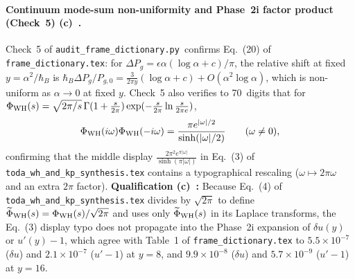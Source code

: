\documentclass[11pt,a4paper]{article}
\newcommand{\Lc}{\textsf{\textbf{(c)}}\ }
\newcommand{\scr}{\texttt{audit\_\allowbreak frame\_\allowbreak dictionary.py}}
\begin{document}
\paragraph{Continuum mode-sum non-uniformity and Phase~2i factor product (Check~5) \Lc.}
Check~5 of \scr\ confirms Eq.~(20) of \texttt{frame\_\allowbreak dictionary.tex}:
for $\Delta P_g=\epsilon\alpha(\log\alpha+c)/\pi$, the relative shift at fixed
$y=\alpha^2/\hbar_B$ is $\hbar_B\Delta P_g/P_{g,0}=\frac{3}{2\pi y}(\log\alpha+c)+O(\alpha^2\log\alpha)$,
which is non-uniform as $\alpha\to 0$ at fixed $y$.
Check~5 also verifies to 70~digits that for
$\Phi_{\rm WH}(s)=\sqrt{2\pi/s}\,\Gamma(1+\frac{s}{2\pi})\exp(-\frac{s}{2\pi}\ln\frac{s}{2\pi e})$,
\[
 \Phi_{\rm WH}(i\omega)\Phi_{\rm WH}(-i\omega)=\frac{\pi e^{|\omega|/2}}{\sinh(|\omega|/2)}
 \qquad (\omega\ne 0),
\]
confirming that the middle display $\frac{2\pi^2 e^{\pi|\omega|}}{\sinh(\pi|\omega|)}$
in Eq.~(3) of \texttt{toda\_\allowbreak wh\_\allowbreak and\_\allowbreak kp\_\allowbreak synthesis.tex}
contains a typographical rescaling ($\omega\mapsto 2\pi\omega$ and an extra $2\pi$
factor). \textbf{Qualification \Lc:} Because Eq.~(4) of
\texttt{toda\_\allowbreak wh\_\allowbreak and\_\allowbreak kp\_\allowbreak synthesis.tex}
divides by $\sqrt{2\pi}$ to define $\widetilde\Phi_{\rm WH}(s)=\Phi_{\rm WH}(s)/\sqrt{2\pi}$
and uses only $\widetilde\Phi_{\rm WH}(s)$ in its Laplace transforms, the Eq.~(3)
display typo does not propagate into the Phase~2i expansion of $\delta u(y)$ or $u'(y)-1$,
which agree with Table~1 of \texttt{frame\_\allowbreak dictionary.tex} to $5.5\times 10^{-7}$
($\delta u$) and $2.1\times 10^{-7}$ ($u'-1$) at $y=8$, and $9.9\times 10^{-8}$ ($\delta u$)
and $5.7\times 10^{-9}$ ($u'-1$) at $y=16$.
\end{document}
